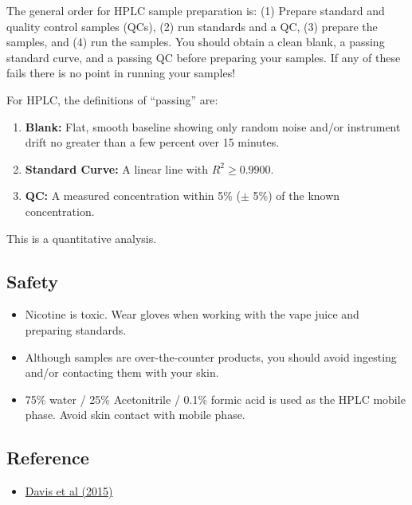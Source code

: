 \documentclass[]{tufte-book}
\providecommand{\tightlist}{%
  \setlength{\itemsep}{0pt}\setlength{\parskip}{0pt}}
\begin{document}
The general order for HPLC sample preparation is: (1) Prepare standard and quality control samples (QCs), (2) run standards and a QC, (3) prepare the samples, and (4) run the samples. You should obtain a clean blank, a passing standard curve, and a passing QC before preparing your samples. If any of these fails there is no point in running your samples!

For HPLC, the definitions of ``passing'' are:

\begin{enumerate}
\def\labelenumi{\arabic{enumi}.}
\tightlist
\item
  \textbf{Blank:} Flat, smooth baseline showing only random noise and/or instrument drift no greater than a few percent over 15 minutes.\\
\item
  \textbf{Standard Curve:} A linear line with \(R^2 \ge 0.9900\).\\
\item
  \textbf{QC:} A measured concentration within 5\% (\(\pm\) 5\%) of the known concentration.
\end{enumerate}

This is a quantitative analysis.

\hypertarget{safety-4}{%
\subsection*{Safety}\label{safety-4}}

\begin{itemize}
\tightlist
\item
  Nicotine is toxic. Wear gloves when working with the vape juice and preparing standards.\\
\item
  Although samples are over-the-counter products, you should avoid ingesting and/or contacting them with your skin.
\item
  75\% water / 25\% Acetonitrile / 0.1\% formic acid is used as the HPLC mobile phase. Avoid skin contact with mobile phase.
\end{itemize}

\hypertarget{reference-1}{%
\subsection*{Reference}\label{reference-1}}

\begin{itemize}
\tightlist
\item
  \href{https://www.ncbi.nlm.nih.gov/pmc/articles/PMC4892702/}{Davis et al (2015)}
\end{itemize}
\end{document}
